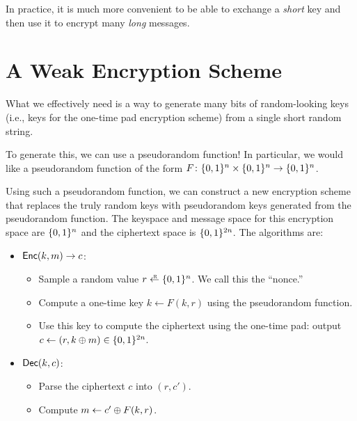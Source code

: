 In practice, it is much more convenient to be able to exchange a \emph{short}
key and then use it to encrypt many \emph{long} messages.

\section{A Weak Encryption Scheme}
What we effectively need is a way to generate many bits of random-looking keys 
(i.e., keys for the one-time pad encryption scheme)
from a single short random string.

To generate this, we can use a pseudorandom function! 
In particular, we would like a pseudorandom 
function of the form $F \colon \{0,1\}^n \times \{0,1\}^n \rightarrow \{0,1\}^n$. 

Using such a pseudorandom function, we can construct a new 
encryption scheme that replaces the truly random keys 
with pseudorandom keys generated from the pseudorandom function.
The keyspace and message space for this encryption space are $\{0,1\}^n$
and the ciphertext space is $\{0,1\}^{2n}$.
The algorithms are:
\begin{itemize}
	\item $\mathsf{Enc}(k, m) \to c$:
      \begin{itemize}
        \item Sample a random value $r \rgets \bin^n$.
              We call this the ``nonce.''
        \item Compute a one-time key $k \gets F(k, r)$ using the pseudorandom function.
        \item Use this key to compute the ciphertext using the one-time pad: 
          output $c \gets (r, k \oplus m) \in \{0,1\}^{2n}$.
      \end{itemize}
	\item $\mathsf{Dec}(k, c)$:
        \begin{itemize}
          \item Parse the ciphertext $c$ into $(r, c')$.
          \item Compute $m \gets c' \oplus F(k, r)$.
        \end{itemize}
\end{itemize}

